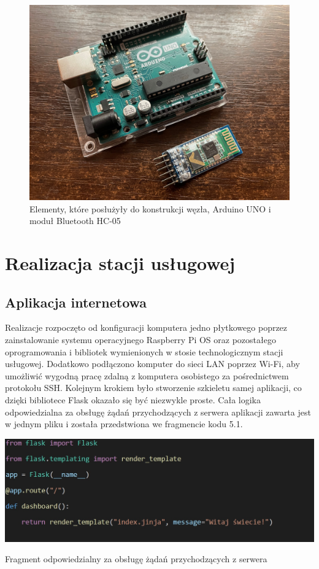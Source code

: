\documentclass[12pt, twoside, openany]{mwrep}
\begin{document}
\begin{figure}[H]
\centering
\includegraphics[scale=0.12]{hc05}
\caption{Elementy, które posłużyły do konstrukcji węzła, Arduino UNO i moduł Bluetooth HC-05}
\end{figure}

\chapter{Realizacja stacji usługowej}

\section{Aplikacja internetowa}

Realizacje rozpoczęto od konfiguracji komputera jedno płytkowego poprzez zainstalowanie systemu operacyjnego Raspberry Pi OS oraz pozostałego oprogramowania i bibliotek wymienionych w stosie technologicznym stacji usługowej. Dodatkowo podłączono komputer do sieci LAN poprzez Wi-Fi, aby umożliwić wygodną pracę zdalną z komputera osobistego za pośrednictwem protokołu SSH. Kolejnym krokiem było stworzenie szkieletu samej aplikacji, co dzięki bibliotece Flask okazało się być niezwykle proste. Cała logika odpowiedzialna za obsługę żądań przychodzących z serwera aplikacji zawarta jest w jednym pliku i została przedstwiona we fragmencie kodu 5.1.
\begin{algorithm}[H]
\centering
\includegraphics[scale=0.42]{kod}
\caption{Fragment odpowiedzialny za obsługę żądań przychodzących z serwera}
\end{algorithm}
\end{document}
